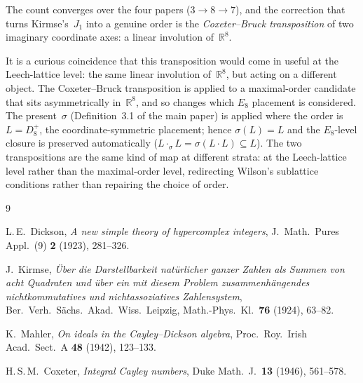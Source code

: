 \documentclass[11pt]{amsart}
\newcommand{\RR}{\mathbb{R}}
\begin{document}
\noindent
The count converges over the four papers ($3 \to 8 \to 7$), and the
correction that turns Kirmse's~$J_1$ into a genuine order is the
\emph{Coxeter--Bruck transposition} of two imaginary coordinate axes: a
linear involution of~$\RR^8$.

It is a curious coincidence that this transposition would come in
useful at the Leech-lattice level: the same linear involution
of~$\RR^8$, but acting on a different object.  The Coxeter--Bruck
transposition is applied to a maximal-order candidate that sits
asymmetrically in~$\RR^8$, and so changes which $E_8$ placement is
considered.  The present~$\sigma$ (Definition~3.1 of the main paper) is
applied where the order is~$L = D_8^+$, the coordinate-symmetric
placement; hence $\sigma(L) = L$ and the $E_8$-level closure is
preserved automatically ($L \cdot_\sigma L = \sigma(L \cdot L)
\subseteq L$).  The two transpositions are the same kind of map at
different strata: at the Leech-lattice level rather than the
maximal-order level, redirecting Wilson's sublattice conditions
rather than repairing the choice of order.

\begin{thebibliography}{9}

L.\,E.~Dickson,
\emph{A new simple theory of hypercomplex integers},
J.~Math.\ Pures Appl.\ (9) \textbf{2} (1923), 281--326.

J.~Kirmse,
\emph{\"Uber die Darstellbarkeit nat\"urlicher ganzer Zahlen als Summen von
acht Quadraten und \"uber ein mit diesem Problem zusammenh\"angendes
nichtkommutatives und nichtassoziatives Zahlensystem},
Ber.\ Verh.\ S\"achs.\ Akad.\ Wiss.\ Leipzig, Math.-Phys.\ Kl.\
\textbf{76} (1924), 63--82.

K.~Mahler,
\emph{On ideals in the Cayley--Dickson algebra},
Proc.\ Roy.\ Irish Acad.\ Sect.\ A \textbf{48} (1942), 123--133.

H.\,S.\,M.~Coxeter,
\emph{Integral Cayley numbers},
Duke Math.\ J.\ \textbf{13} (1946), 561--578.

\end{thebibliography}
\end{document}
